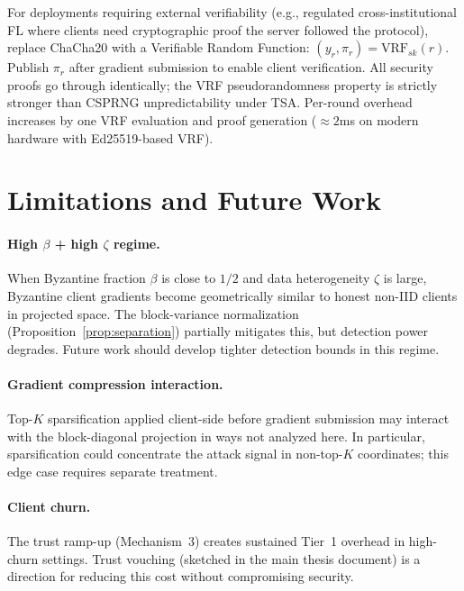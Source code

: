 \documentclass{article}
\begin{document}
For deployments requiring external verifiability (e.g., regulated
cross-institutional FL where clients need cryptographic proof the server
followed the protocol), replace ChaCha20 with a Verifiable Random Function:
$(y_r, \pi_r) = \mathrm{VRF}_{sk}(r)$.
Publish $\pi_r$ after gradient submission to enable client verification.
All security proofs go through identically; the VRF pseudorandomness
property is strictly stronger than CSPRNG unpredictability under TSA.
Per-round overhead increases by one VRF evaluation and proof generation
($\approx 2$ms on modern hardware with Ed25519-based VRF).

\section{Limitations and Future Work}
\label{app:limits}

\paragraph{High $\beta$ + high $\zeta$ regime.}
When Byzantine fraction $\beta$ is close to $1/2$ and data heterogeneity
$\zeta$ is large, Byzantine client gradients become geometrically similar to
honest non-IID clients in projected space.
The block-variance normalization (Proposition~\ref{prop:separation}) partially
mitigates this, but detection power degrades.
Future work should develop tighter detection bounds in this regime.

\paragraph{Gradient compression interaction.}
Top-$K$ sparsification applied client-side before gradient submission may
interact with the block-diagonal projection in ways not analyzed here.
In particular, sparsification could concentrate the attack signal in
non-top-$K$ coordinates; this edge case requires separate treatment.

\paragraph{Client churn.}
The trust ramp-up (Mechanism~3) creates sustained Tier~1 overhead in
high-churn settings.
Trust vouching (sketched in the main thesis document) is a direction for
reducing this cost without compromising security.
\end{document}
